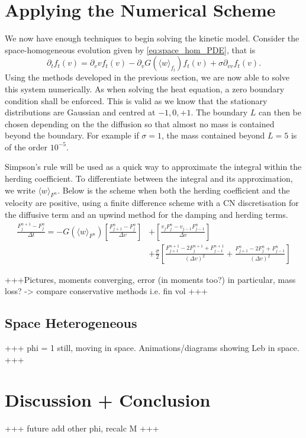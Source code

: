 \documentclass[11pt, a4paper, draft]{article}
\begin{document}
          
		\section{Applying the Numerical Scheme}
			We now have enough techniques to begin solving the kinetic model. Consider the space-homogeneous evolution given by \eqref{eq:space_hom_PDE}, that is
			\begin{equation}
				\partial_t f_t(v) = \partial_v vf_t(v) - \partial_v G(\langle w \rangle_{f_t})f_t(v) + \sigma \partial_{vv} f_t(v).
			\end{equation}
            Using the methods developed in the previous section, we are now able to solve this system numerically. As when solving the heat equation, a zero boundary condition shall be enforced. This is valid as we know that the stationary distributions are Gaussian and centred at $-1,0,+1$. The boundary $L$ can then be chosen depending on the the diffusion so that almost no mass is contained beyond the boundary. For example if $\sigma = 1$, the mass contained beyond $L=5$ is of the order $10^{-5}$. 
            
			Simpson's rule will be used as a quick way to approximate the integral within the herding coefficient. To differentiate between the integral and its approximation, we write \(\langle w\rangle_{F^n}\). Below is the scheme when both the herding coefficient and the velocity are positive, using a finite difference scheme with a CN discretisation for the diffusive term and an upwind method for the damping and herding terms.
			\begin{equation*}
			\begin{split}
				\frac{F_j^{n+1} - F_j^n}{\Delta t} = 	-G(\langle w\rangle_{F^n})\left[ \frac{F^n_{j+1} - F^n_{j}}{\Delta v}\right] &+\left[ \frac{v_{j}F^n_{j} - v_{j-1}F^n_{j-1}}{\Delta v}\right]\\ &+ \frac{\sigma}{2}\left[ \frac{F^{n+1}_{j+1} - 2F^{n+1}_j + F^{n+1}_{j-1}}{(\Delta v)^2} + \frac{F^{n}_{j+1} - 2F^{n}_j + F^{n}_{j-1}}{(\Delta v)^2}\right] 	 
			\end{split}
			\end{equation*}

			+++Pictures, moments converging, error (in moments too?) in particular, mass loss? -> compare conservative methods i.e. fin vol +++
   \subsection{Space Heterogeneous}
        +++ phi = 1 still, moving in space. Animations/diagrams showing Leb in space. +++
        
        \section{Discussion + Conclusion}
        +++ future add other phi, recalc M +++
	
	
	\appendix
\end{document}
